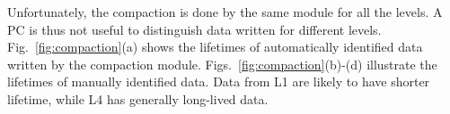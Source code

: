 
Unfortunately, the compaction is done by the same module for all the levels.
A PC is thus not useful to distinguish data written for different levels.
Fig.~\ref{fig:compaction}(a) shows the lifetimes of automatically identified data written by the
compaction module. 
Figs.~\ref{fig:compaction}(b)-(d) illustrate the lifetimes
of manually identified data.
Data from L1 are likely to have shorter lifetime, while L4 has generally
long-lived data.

